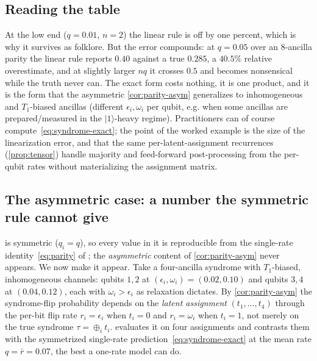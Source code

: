 \documentclass[11pt]{article}
\numberwithin{equation}{section}
\theoremstyle{plain}
\theoremstyle{definition}
\theoremstyle{remark}
\newcommand{\eps}{\epsilon}
\newcommand{\ket}[1]{\lvert #1 \rangle}
\newcommand{\bxor}{\oplus}
\begin{document}
\subsection{Reading the table}

At the low end ($q=0.01$, $n=2$) the linear rule is off by one percent, which is
why it survives as folklore. But the error compounds: at $q=0.05$ over an
$8$-ancilla parity the linear rule reports $0.40$ against a true $0.285$, a
$40.5\%$ relative overestimate, and at slightly larger $nq$ it crosses $0.5$ and
becomes nonsensical while the truth never can. The exact form costs nothing, it
is one product, and it is the form that the asymmetric \cref{cor:parity-asym}
generalizes to inhomogeneous and $T_1$-biased ancillas (different $\eps_i,\omega_i$
per qubit, e.g. when some ancillas are prepared/measured in the $\ket{1}$-heavy
regime). Practitioners can of course compute~\eqref{eq:syndrome-exact}; the
point of the worked example is the size of the linearization error, and that
the same per-latent-assignment recurrences (\cref{prop:tensor}) handle majority
and feed-forward post-processing from the per-qubit rates without
materializing the assignment matrix.

\subsection{The asymmetric case: a number the symmetric rule cannot give}
\label{sec:worked-asym}

 is symmetric ($q_i=q$), so every value in it is reproducible
from the single-rate identity~\eqref{eq:parity} of
\citet[Lemma~1]{gallager1962ldpc}; the
\emph{asymmetric} content of \cref{cor:parity-asym} never appears. We now make it
appear. Take a four-ancilla syndrome with $T_1$-biased, inhomogeneous channels:
qubits $1,2$ at $(\eps_i,\omega_i)=(0.02,0.10)$ and qubits $3,4$ at $(0.04,0.12)$,
each with $\omega_i>\eps_i$ as relaxation dictates. By \cref{cor:parity-asym} the
syndrome-flip probability depends on the \emph{latent assignment}
$(t_1,\dots,t_4)$ through the per-bit flip rate $r_i=\eps_i$ when $t_i=0$ and
$r_i=\omega_i$ when $t_i=1$, not merely on the true syndrome $\tau=\bxor_i t_i$.
 evaluates it on four assignments and contrasts them with
the symmetrized single-rate prediction~\eqref{eq:syndrome-exact} at the mean rate
$q=\bar r=0.07$, the best a one-rate model can do.
\end{document}
